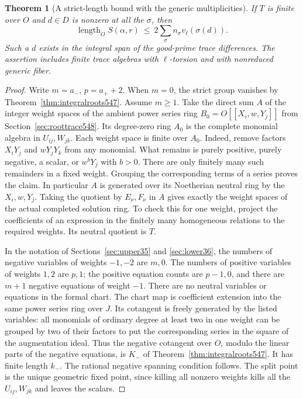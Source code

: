 \documentclass[a4paper,11pt]{article}
\newtheorem{theorem}[proposition]{Theorem}
\theoremstyle{definition}
\theoremstyle{remark}
\numberwithin{equation}{section}
\begin{document}
\begin{theorem}[A strict-length bound with the generic multiplicities]
\leavevmode\label{thm:lengthmultiplicity550}
If \(T\) is finite over \(O\) and \(d\in D\) is nonzero at all
the \(\sigma\), then
\[
 \operatorname{length}_O S(\alpha,r)
       \ \le\ 2\sum_\sigma n_\sigma v_\ell(\sigma(d)).
\]
Such a \(d\) exists in the integral span of the good-prime trace
differences. The assertion includes finite trace algebras with
\(\ell\)-torsion and with nonreduced generic fiber.
\end{theorem}
\begin{proof}
Write \(m=a_-\), \(p=a_++2\). When \(m=0\), the strict group
vanishes by Theorem~\ref{thm:integralroots547}. Assume \(m\ge1\).
Take the direct sum \(A\) of the integer weight spaces of the
ambient power series ring \(B_0=O[[X_i,w,Y_j]]\) from
Section~\ref{sec:roottrace548}. Its degree-zero ring \(A_0\) is
the complete monomial algebra in \(U_{ij},W_{jk}\). Each weight
space is finite over \(A_0\). Indeed, remove factors \(X_iY_j\)
and \(wY_jY_k\) from any monomial. What remains is purely
positive, purely negative, a scalar, or \(w^bY_j\) with \(b>0\).
There are only finitely many such remainders in a fixed weight.
Grouping the corresponding terms of a series proves the claim.
In particular \(A\) is generated over its Noetherian neutral
ring by the \(X_i,w,Y_j\). Taking the quotient by \(E_\nu,F_\nu\)
in \(A\) gives exactly the weight spaces of the actual completed
solution ring. To check this for one weight, project the coefficients
of an expression in the finitely many homogeneous relations to
the required weights. Its neutral quotient is \(T\).

In the notation of Sections~\ref{sec:upper35} and
\ref{sec:lower36}, the numbers of negative variables of weights
\(-1,-2\) are \(m,0\). The numbers of positive variables of
weights \(1,2\) are \(p,1\); the positive equation counts are
\(p-1,0\), and there are \(m+1\) negative equations of weight
\(-1\). There are no neutral variables or equations in the formal
chart. The chart map is coefficient extension into the same power
series ring over \(J\). Its cotangent is freely generated by the
listed variables: all monomials of ordinary degree at least two
in one weight can be grouped by two of their factors to put the
corresponding series in the square of the augmentation ideal.
Thus the negative cotangent over \(O\), modulo the linear parts
of the negative equations, is \(K_-\) of
Theorem~\ref{thm:integralroots547}. It has finite length \(k_-\).
The rational negative spanning condition follows. The split
point is the unique geometric fixed point, since killing all
nonzero weights kills all the \(U_{ij},W_{jk}\) and leaves the
scalars.


\end{proof}
\end{document}
